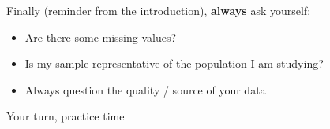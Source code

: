 \documentclass[compress]{beamer}
\begin{document}
\begin{frame}
	Finally (reminder from the introduction), \textbf{always} ask yourself:
	\vspace{0.2cm}
	\begin{itemize}
		\item Are there some missing values? 
		\vspace{0.2cm}
		\item Is my sample representative of the population I am studying? 
		\vspace{0.2cm}
		\item Always question the quality / source of your data
	\end{itemize}
\end{frame}

\begin{frame}
	Your turn, practice time
\end{frame}
\end{document}
